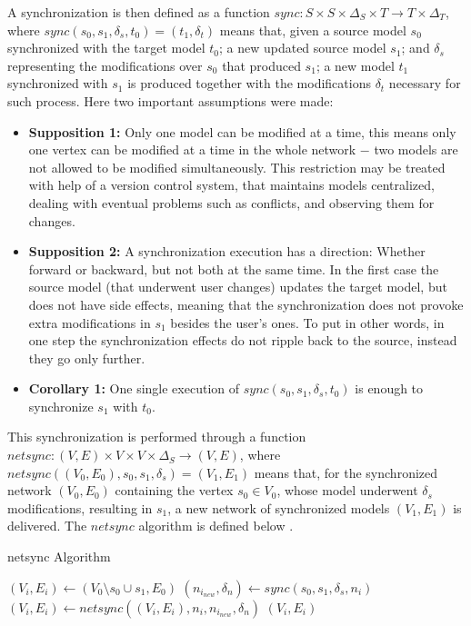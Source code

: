 \documentclass[tuberlin,cic,tc,english,noabntcite, oneside]{iiufrgs}
\begin{document}
A synchronization is then defined as a function $sync: S \times S \times \Delta_S \times T \rightarrow T \times \Delta_T$, where $sync (s_0, s_1, \delta_s, t_0) = (t_1, \delta_t)$ means that, given a source model $s_0$ synchronized with the target model $t_0$; a new updated source model $s_1$; and $\delta_s$ representing the modifications over $s_0$ that produced $s_1$; a new model $t_1$ synchronized with $s_1$ is produced together with the modifications $\delta_t$ necessary for such process. Here two important assumptions were made:

\begin{itemize}
\item \textbf{Supposition 1:} Only one model can be modified at a time, this means only one vertex can be modified at a time in the whole network $-$ two models are not allowed to be modified simultaneously. This restriction may be treated with help of a version control system, that maintains models centralized, dealing with eventual problems such as conflicts, and observing them for changes.

\item \textbf{Supposition 2:} A synchronization execution has a direction: Whether forward or backward, but not both at the same time. In the first case the source model (that underwent user changes) updates the target model, but does not have side effects, meaning that the synchronization does not provoke extra modifications in $s_1$ besides the user's ones. To put in other words, in one step the synchronization effects do not ripple back to the source, instead they go only further.

\item \textbf{Corollary 1:} One single execution of $sync (s_0, s_1, \delta_s, t_0)$ is enough to synchronize $s_1$ with $t_0$.
\end{itemize}

This synchronization is performed through a function $netsync: (V,E) \times V \times V \times \Delta_S \rightarrow (V,E)$, where $netsync ((V_0,E_0), s_0, s_1, \delta_s) = (V_1,E_1)$ means that, for the synchronized network $(V_0,E_0)$ containing the vertex $s_0 \in V_0$, whose model underwent $\delta_s$ modifications, resulting in $s_1$, a new network of synchronized models $(V_1,E_1)$ is delivered. The $netsync$ algorithm is defined below	.

\begin{algorithm}[H]
	\caption{netsync Algorithm}
	\begin{algorithmic}[1]
		\State $(V_i,E_i) \leftarrow (V_0 \setminus s_0 \cup s_1, E_0)$ 
			\State $(n_{i_{new}}, \delta_n) \leftarrow sync(s_0, s_1, \delta_s, n_i)$ 
			 
				\State $(V_i,E_i) \leftarrow netsync((V_i,E_i), n_i, n_{i_{new}}, \delta_n)$ 
			\EndIf
		\EndFor
		\State \Return $(V_i, E_i)$
		\EndFunction
	\end{algorithmic}
\end{algorithm}
\end{document}
